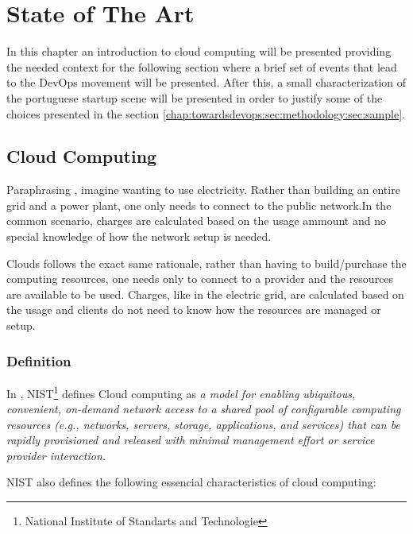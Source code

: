 \chapter{State of The Art} \label{chap:stateoftheart}
  In this chapter an introduction to cloud computing will be presented providing the needed context for the following section where a brief set of events that lead to the DevOps movement will be presented. After this, a small characterization of the portuguese startup scene will be presented in order to justify some of the choices presented in the section \ref{chap:towardsdevops:sec:methodology:sec:sample}.

    \section{Cloud Computing} \label{chap:stateoftheart:sec:cloud}

        Paraphrasing \cite{Debois2008}, imagine  wanting to use electricity. Rather than building an entire grid and a power plant, one only needs to connect to the public network.In the common scenario, charges are calculated based on the usage ammount and no special knowledge of how the network setup is needed.

        Clouds follows the exact same rationale, rather than having to build/purchase the computing resources, one needs only to connect to a provider and the resources are available to be used. Charges, like in the electric grid, are calculated based on the usage and clients do not need to know how the resources are managed or setup.

        \subsection{Definition}
        In \cite{Mell2011}, NIST\footnote{National Institute of Standarts and Technologie} defines Cloud computing as \textit{a model for enabling ubiquitous, convenient, on-demand network access to a shared pool of configurable computing resources (e.g., networks, servers, storage, applications, and services) that can be rapidly provisioned and released with minimal management effort or service provider interaction.}

        NIST also defines the following essencial characteristics of cloud computing:


